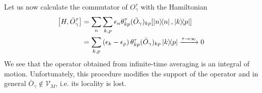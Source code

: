 Let us now calculate the commutator of \(O_{\gamma}^{\tau}\) with the Hamiltonian
\begin{align}
    \comm{H}{\bar{O}_{\gamma}^{\tau}} & = \sum_n \sum_{k,p} \epsilon_n \theta_{kp}^{\tau} (\bar{O}_{\gamma})_{kp} \comm{ \ketbra{n}{n}}{ \ketbra{k}{p}} \nonumber         \\
                             & = \sum_{k,p} \left(\epsilon_k-\epsilon_p\right) \theta_{kp}^{\tau} (\bar{O}_{\gamma})_{kp} \ketbra{k}{p} \xrightarrow{\tau \to \infty} 0 
        \label{eq:time_averaged_commutator}
\end{align}
We see that the operator obtained from infinite-time averaging is an integral of motion. Unfortunately,
this procedure modifies the support of the operator and in general \(\bar{O}_{\gamma} \not\in \mathcal{V}_M\), i.e. its locality is lost.

